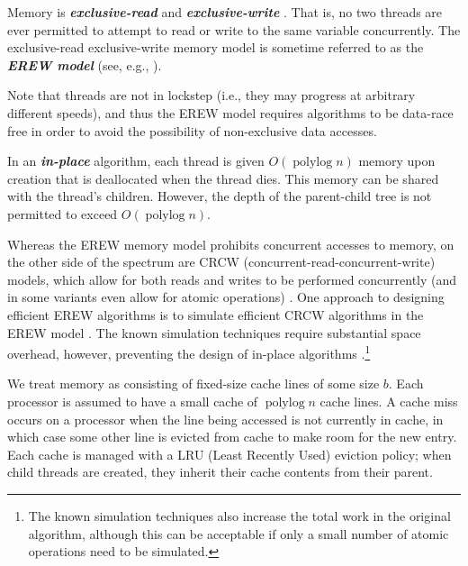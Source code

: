 \documentclass[11pt]{article}
\newcommand{\polylog}{\operatorname{polylog}}
\newcommand{\defn}[1]{{\textit{\textbf{\boldmath #1}}} }
\renewcommand{\paragraph}[1]{\vspace{0.09in}\noindent{\bf \boldmath #1.}}
\theoremstyle{remark}
\theoremstyle{remark}
\begin{document}
\paragraph{Memory Model} Memory is \defn{exclusive-read} and \defn{exclusive-write}. That is, no two threads are ever permitted to attempt to read or write to the same variable concurrently. 
The exclusive-read exclusive-write memory model is sometime referred
to as the \defn{EREW model} (see, e.g., \cite{Hagerup89}).

Note that threads are not in lockstep (i.e., they may progress at arbitrary different speeds), and thus the EREW model requires algorithms to be data-race free in order to avoid the possibility of non-exclusive data accesses.

In an \defn{in-place} algorithm, each thread is given $O(\polylog n)$
memory upon creation that is deallocated when the thread dies. This
memory can be shared with the thread's children. However, the depth of
the parent-child tree is not permitted to exceed $O(\polylog n)$.

Whereas the EREW memory model prohibits concurrent accesses to memory, on the
other side of the spectrum are CRCW (concurrent-read-concurrent-write) models,
which allow for both reads and writes to be performed concurrently (and in some
variants even allow for atomic operations)
\cite{Blelloch96,AcarBl16,MatiasVi95}. One approach to designing efficient EREW
algorithms is to simulate efficient CRCW algorithms in the EREW model
\cite{MatiasVi95}. The known simulation techniques require substantial space
overhead, however, preventing the design of in-place algorithms
\cite{MatiasVi95}.\footnote{The known simulation techniques also increase the
total work in the original algorithm, although this can be acceptable if only a
small number of atomic operations need to be simulated.}



\paragraph{Modeling Cache Misses}
We treat memory as consisting of fixed-size cache lines of some
size $b$. Each processor is assumed to have a small cache of
$\operatorname{polylog}{n}$ cache lines.  A cache miss occurs on a
processor when the line being accessed is not currently in cache, in
which case some other line is evicted from cache to make room for the
new entry.  Each cache is managed with a LRU (Least Recently Used)
eviction policy; when child threads are created, they inherit their
cache contents from their parent.
\end{document}
